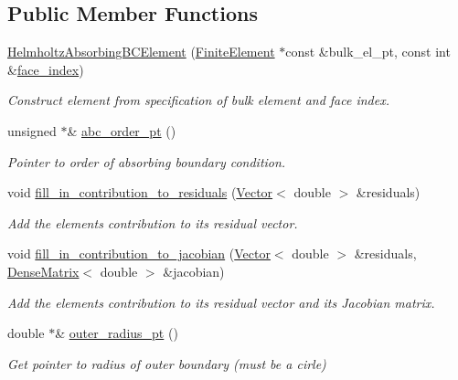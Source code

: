 \subsection*{Public Member Functions}
\begin{DoxyCompactItemize}
\item 
\hyperlink{classoomph_1_1HelmholtzAbsorbingBCElement_a97854c784c46cae588db1d608f9ac445}{Helmholtz\+Absorbing\+B\+C\+Element} (\hyperlink{classoomph_1_1FiniteElement}{Finite\+Element} $\ast$const \&bulk\+\_\+el\+\_\+pt, const int \&\hyperlink{classoomph_1_1FaceElement_a478d577ac6db67ecc80f1f02ae3ab170}{face\+\_\+index})
\begin{DoxyCompactList}\small\item\em Construct element from specification of bulk element and face index. \end{DoxyCompactList}\item 
unsigned $\ast$\& \hyperlink{classoomph_1_1HelmholtzAbsorbingBCElement_aa6e53edbfec802b112527fbb5ee06754}{abc\+\_\+order\+\_\+pt} ()
\begin{DoxyCompactList}\small\item\em Pointer to order of absorbing boundary condition. \end{DoxyCompactList}\item 
void \hyperlink{classoomph_1_1HelmholtzAbsorbingBCElement_a4835fe36ebcb4d9a9e6845fb5a75224b}{fill\+\_\+in\+\_\+contribution\+\_\+to\+\_\+residuals} (\hyperlink{classoomph_1_1Vector}{Vector}$<$ double $>$ \&residuals)
\begin{DoxyCompactList}\small\item\em Add the element\textquotesingle{}s contribution to its residual vector. \end{DoxyCompactList}\item 
void \hyperlink{classoomph_1_1HelmholtzAbsorbingBCElement_a2ddc7be679d396847964aed6d545e168}{fill\+\_\+in\+\_\+contribution\+\_\+to\+\_\+jacobian} (\hyperlink{classoomph_1_1Vector}{Vector}$<$ double $>$ \&residuals, \hyperlink{classoomph_1_1DenseMatrix}{Dense\+Matrix}$<$ double $>$ \&jacobian)
\begin{DoxyCompactList}\small\item\em Add the element\textquotesingle{}s contribution to its residual vector and its Jacobian matrix. \end{DoxyCompactList}\item 
double $\ast$\& \hyperlink{classoomph_1_1HelmholtzAbsorbingBCElement_a97ebf5721fa9f8928739b15781cfa296}{outer\+\_\+radius\+\_\+pt} ()
\begin{DoxyCompactList}\small\item\em Get pointer to radius of outer boundary (must be a cirle) \end{DoxyCompactList}\end{DoxyCompactItemize}
